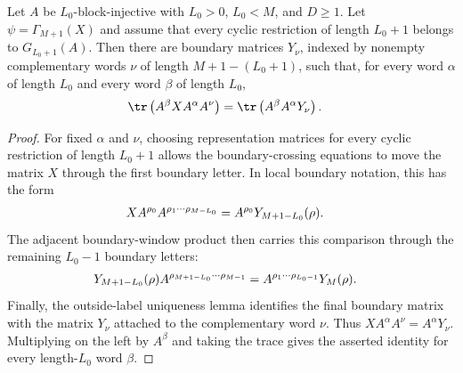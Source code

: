 \begin{lemma}
    \label{thm:closure_property_boundary_block_window_trace_word_ground_space_map}
    \leanok
    Let $A$ be $L_0$-block-injective with $L_0>0$, $L_0<M$, and
    $D\ge1$. Let $\psi=\Gamma_{M+1}(X)$ and assume that every cyclic
    restriction of length $L_0+1$ belongs to $G_{L_0+1}(A)$. Then there are
    boundary matrices $Y_\nu$, indexed by nonempty complementary words $\nu$
    of length $M+1-(L_0+1)$, such that, for every word $\alpha$ of length
    $L_0$ and every word $\beta$ of length $L_0$,
    \begin{align}
        \tr\left(A^\beta X A^\alpha A^\nu\right)
         & = \tr\left(A^\beta A^\alpha Y_\nu\right).
        \notag
    \end{align}
\end{lemma}

\begin{proof}
    \leanok
    For fixed $\alpha$ and $\nu$, choosing representation matrices for every
    cyclic restriction of length $L_0+1$ allows the boundary-crossing equations
    to move the matrix $X$ through the first boundary letter. In local boundary
    notation, this has the form
    \begin{align}
        X A^{\rho_0}A^{\rho_1\cdots\rho_{M-L_0}}
         & = A^{\rho_0}Y_{M+1-L_0}(\rho).
        \notag
    \end{align}
    The adjacent boundary-window product then carries this comparison
    through the remaining $L_0-1$ boundary letters:
    \begin{align}
        Y_{M+1-L_0}(\rho)A^{\rho_{M+1-L_0}\cdots\rho_{M-1}}
         & = A^{\rho_1\cdots\rho_{L_0-1}}Y_M(\rho).
        \notag
    \end{align}
    Finally, the outside-label uniqueness lemma identifies the final boundary
    matrix with the matrix $Y_\nu$ attached to the complementary word $\nu$.
    Thus $X A^\alpha A^\nu=A^\alpha Y_\nu$. Multiplying on the left by
    $A^\beta$ and taking the trace gives the asserted identity for every
    length-$L_0$ word $\beta$.
\end{proof}

